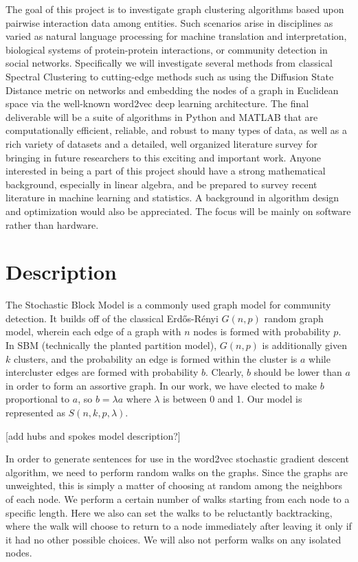 \documentclass{article}
\begin{document}
The goal of this project is to investigate graph clustering algorithms based upon pairwise interaction data among entities. Such scenarios arise in disciplines as varied as natural language processing for machine translation and interpretation, biological systems of protein-protein interactions, or community detection in social networks. Specifically we will investigate several methods from classical Spectral Clustering to cutting-edge methods such as using the Diffusion State Distance metric on networks and embedding the nodes of a graph in Euclidean space via the well-known word2vec deep learning architecture. The final deliverable will be a suite of algorithms in Python and MATLAB that are computationally efficient, reliable, and robust to many types of data, as well as a rich variety of datasets and a detailed, well organized literature survey for bringing in future researchers to this exciting and important work.
Anyone interested in being a part of this project should have a strong mathematical background, especially in linear algebra, and be prepared to survey recent literature in machine learning and statistics. A background in algorithm design and optimization would also be appreciated. The focus will be mainly on software rather than hardware.

\section{Description}

The Stochastic Block Model is a commonly used graph model for community detection. It builds off of the classical Erdős-Rényi $G(n,p)$ random graph model, wherein each edge of a graph with $n$ nodes is formed with probability $p$. In SBM (technically the planted partition model), $G(n,p)$ is additionally given $k$ clusters, and the probability an edge is formed within the cluster is $a$ while intercluster edges are formed with probability $b$. Clearly, $b$ should be lower than $a$ in order to form an assortive graph. In our work, we have elected to make $b$ proportional to $a$, so $b = \lambda a$ where $\lambda$ is between 0 and 1. Our model is represented as $S(n,k,p,\lambda)$.

[add hubs and spokes model description?]

In order to generate sentences for use in the word2vec stochastic gradient descent algorithm, we need to perform random walks on the graphs. Since the graphs are unweighted, this is simply a matter of choosing at random among the neighbors of each node. We perform a certain number of walks starting from each node to a specific length. Here we also can set the walks to be reluctantly backtracking, where the walk will choose to return to a node immediately after leaving it only if it had no other possible choices. We will also not perform walks on any isolated nodes.
\end{document}
